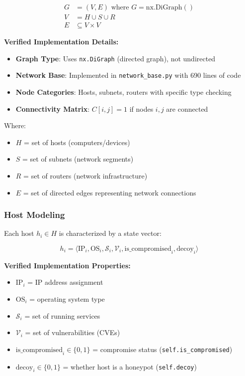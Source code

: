 \documentclass[12pt,a4paper]{article}
\begin{document}
\begin{align}
G &= (V, E) \text{ where } G = \text{nx.DiGraph}() \\
V &= H \cup S \cup R \\
E &\subseteq V \times V
\end{align}

\textbf{Verified Implementation Details:}
\begin{itemize}
    \item \textbf{Graph Type}: Uses \texttt{nx.DiGraph} (directed graph), not undirected
    \item \textbf{Network Base}: Implemented in \texttt{network\_base.py} with 690 lines of code
    \item \textbf{Node Categories}: Hosts, subnets, routers with specific type checking
    \item \textbf{Connectivity Matrix}: $C[i,j] = 1$ if nodes $i,j$ are connected
\end{itemize}

Where:
\begin{itemize}
    \item $H$ = set of hosts (computers/devices)
    \item $S$ = set of subnets (network segments)  
    \item $R$ = set of routers (network infrastructure)
    \item $E$ = set of directed edges representing network connections
\end{itemize}

\subsubsection{Host Modeling}
Each host $h_i \in H$ is characterized by a state vector:

\begin{equation}
h_i = \langle \text{IP}_i, \text{OS}_i, \mathcal{S}_i, \mathcal{V}_i, \text{is\_compromised}_i, \text{decoy}_i \rangle
\end{equation}

\textbf{Verified Implementation Properties:}
\begin{itemize}
    \item $\text{IP}_i$ = IP address assignment
    \item $\text{OS}_i$ = operating system type  
    \item $\mathcal{S}_i$ = set of running services
    \item $\mathcal{V}_i$ = set of vulnerabilities (CVEs)
    \item $\text{is\_compromised}_i \in \{0, 1\}$ = compromise status (\texttt{self.is\_compromised})
    \item $\text{decoy}_i \in \{0, 1\}$ = whether host is a honeypot (\texttt{self.decoy})
\end{itemize}
\end{document}
